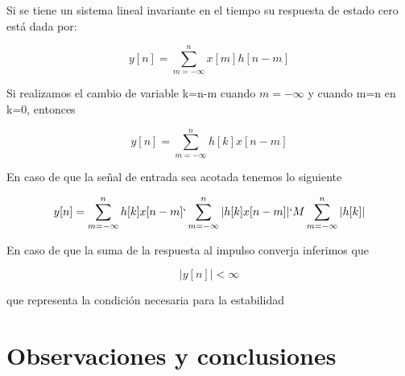 Si se tiene un sistema lineal invariante en el tiempo su respuesta de estado cero está dada por:

\begin{equation}
y[n]=\sum_{m=-\infty}^n x[m]h[n-m]
\end{equation}

Si realizamos el cambio de variable k=n-m cuando $m=-\infty$ y cuando m=n en k=0, entonces

\begin{equation}
y[n]=\sum_{m=-\infty}^n h[k]x[n-m]
\end{equation}

En caso de que la señal de entrada sea acotada tenemos lo siguiente

\begin{equation}
y[n]=\sum_{m=-\infty}^n h[k]x[n-m] \lq \sum_{m=-\infty}^n |h[k]x[n-m]| \lq M\sum_{m=-\infty}^n |h[k]|
\end{equation}

En caso de que la suma de la respuesta al impulso converja inferimos que 

\begin{equation}
|y[n]|<\infty
\end{equation}

que representa la condición necesaria para la estabilidad

\section{Observaciones y conclusiones}

